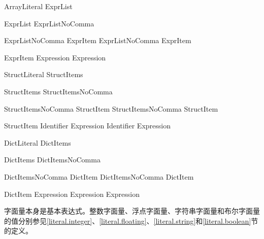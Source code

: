 \begin{bnf}{ArrayLiteral}
    \terminal{[} ExprList\bnfq \terminal{]}
\end{bnf}

\begin{bnf}{ExprList}
    ExprListNoComma \terminal{,}\bnfq
\end{bnf}

\begin{bnf}{ExprListNoComma}
    ExprItem \br
    ExprListNoComma \terminal{,} ExprItem
\end{bnf}

\begin{bnf}{ExprItem}
    Expression \br
     Expression\bnfq
\end{bnf}

\begin{bnf}{StructLiteral}
    \terminal{(} StructItems\bnfq \terminal{)}
\end{bnf}

\begin{bnf}{StructItems}
    StructItemsNoComma \terminal{,}\bnfq
\end{bnf}

\begin{bnf}{StructItemsNoComma}
    StructItem \br
    StructItemsNoComma \terminal{,} StructItem
\end{bnf}

\begin{bnf}{StructItem}
    Identifier \terminal{:} Expression \br
    Identifier \br
     Expression\bnfq
\end{bnf}

\begin{bnf}{DictLiteral}
    \terminal{[} DictItems \terminal{]} \br
    \terminal{[} \terminal{:} \terminal{]}
\end{bnf}

\begin{bnf}{DictItems}
    DictItemsNoComma \terminal{,}\bnfq
\end{bnf}

\begin{bnf}{DictItemsNoComma}
    DictItem \br
    DictItemsNoComma \terminal{,} DictItem
\end{bnf}

\begin{bnf}{DictItem}
    Expression \terminal{:} Expression \br
     Expression
\end{bnf}

\pnum
字面量本身是基本表达式。整数字面量、浮点字面量、字符串字面量和布尔字面量的值分别参见\ref{literal.integer}、\ref{literal.floating}、\ref{literal.string}和\ref{literal.boolean}节的定义。

